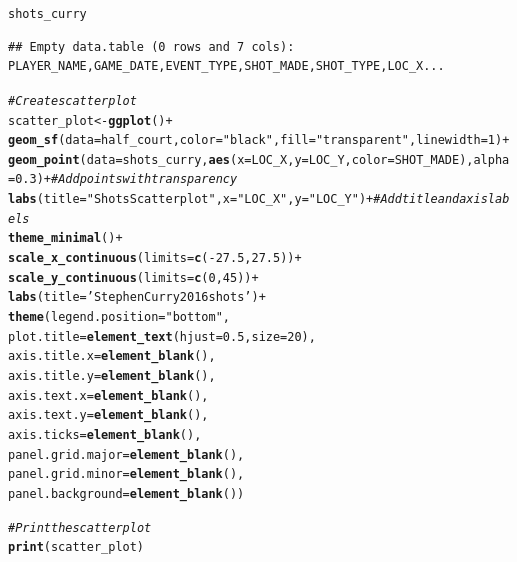 \documentclass{article}\usepackage[]{graphicx}\usepackage[]{xcolor}
\makeatletter
\newcommand{\hlnum}[1]{\textcolor[rgb]{0.686,0.059,0.569}{#1}}%
\newcommand{\hlstr}[1]{\textcolor[rgb]{0.192,0.494,0.8}{#1}}%
\newcommand{\hlcom}[1]{\textcolor[rgb]{0.678,0.584,0.686}{\textit{#1}}}%
\newcommand{\hlopt}[1]{\textcolor[rgb]{0,0,0}{#1}}%
\newcommand{\hlstd}[1]{\textcolor[rgb]{0.345,0.345,0.345}{#1}}%
\newcommand{\hlkwb}[1]{\textcolor[rgb]{0.69,0.353,0.396}{#1}}%
\newcommand{\hlkwc}[1]{\textcolor[rgb]{0.333,0.667,0.333}{#1}}%
\newcommand{\hlkwd}[1]{\textcolor[rgb]{0.737,0.353,0.396}{\textbf{#1}}}%
\newenvironment{kframe}{%
 \def\at@end@of@kframe{}%
 \ifinner\ifhmode%
  \def\at@end@of@kframe{\end{minipage}}%
  \begin{minipage}{\columnwidth}%
 \fi\fi%
 \def\FrameCommand##1{\hskip\@totalleftmargin \hskip-\fboxsep
 \colorbox{shadecolor}{##1}\hskip-\fboxsep
     \hskip-\linewidth \hskip-\@totalleftmargin \hskip\columnwidth}%
 \MakeFramed {\advance\hsize-\width
   \@totalleftmargin\z@ \linewidth\hsize
   \@setminipage}}%
 {\par\unskip\endMakeFramed%
 \at@end@of@kframe}
\newenvironment{knitrout}{}{} %
\makeatother
\begin{document}
\begin{knitrout}
\begin{kframe}
\begin{alltt}
\hlstd{shots_curry}
\end{alltt}
\begin{verbatim}
## Empty data.table (0 rows and 7 cols): PLAYER_NAME,GAME_DATE,EVENT_TYPE,SHOT_MADE,SHOT_TYPE,LOC_X...
\end{verbatim}
\begin{alltt}
\hlcom{# Create scatter plot}
\hlstd{scatter_plot} \hlkwb{<-} \hlkwd{ggplot}\hlstd{()} \hlopt{+}
  \hlkwd{geom_sf}\hlstd{(}\hlkwc{data} \hlstd{= half_court,} \hlkwc{color} \hlstd{=} \hlstr{"black"}\hlstd{,} \hlkwc{fill} \hlstd{=} \hlstr{"transparent"}\hlstd{,} \hlkwc{linewidth} \hlstd{=} \hlnum{1}\hlstd{)} \hlopt{+}
  \hlkwd{geom_point}\hlstd{(}\hlkwc{data} \hlstd{= shots_curry,} \hlkwd{aes}\hlstd{(}\hlkwc{x} \hlstd{= LOC_X,} \hlkwc{y} \hlstd{= LOC_Y,} \hlkwc{color} \hlstd{= SHOT_MADE),} \hlkwc{alpha} \hlstd{=} \hlnum{0.3}\hlstd{)} \hlopt{+}  \hlcom{# Add points with transparency}
  \hlkwd{labs}\hlstd{(}\hlkwc{title} \hlstd{=} \hlstr{"Shots Scatterplot"}\hlstd{,} \hlkwc{x} \hlstd{=} \hlstr{"LOC_X"}\hlstd{,} \hlkwc{y} \hlstd{=} \hlstr{"LOC_Y"}\hlstd{)} \hlopt{+}  \hlcom{# Add title and axis labels}
  \hlkwd{theme_minimal}\hlstd{()} \hlopt{+}
  \hlkwd{scale_x_continuous}\hlstd{(}\hlkwc{limits} \hlstd{=} \hlkwd{c}\hlstd{(}\hlopt{-}\hlnum{27.5}\hlstd{,} \hlnum{27.5}\hlstd{))} \hlopt{+}
  \hlkwd{scale_y_continuous}\hlstd{(}\hlkwc{limits} \hlstd{=} \hlkwd{c}\hlstd{(}\hlnum{0}\hlstd{,} \hlnum{45}\hlstd{))} \hlopt{+}
  \hlkwd{labs}\hlstd{(}\hlkwc{title} \hlstd{=} \hlstr{'Stephen Curry 2016 shots'}\hlstd{)} \hlopt{+}
  \hlkwd{theme}\hlstd{(}\hlkwc{legend.position} \hlstd{=} \hlstr{"bottom"}\hlstd{,}
        \hlkwc{plot.title} \hlstd{=} \hlkwd{element_text}\hlstd{(}\hlkwc{hjust} \hlstd{=} \hlnum{0.5}\hlstd{,} \hlkwc{size} \hlstd{=} \hlnum{20}\hlstd{),}
        \hlkwc{axis.title.x} \hlstd{=} \hlkwd{element_blank}\hlstd{(),}
        \hlkwc{axis.title.y} \hlstd{=} \hlkwd{element_blank}\hlstd{(),}
        \hlkwc{axis.text.x} \hlstd{=} \hlkwd{element_blank}\hlstd{(),}
        \hlkwc{axis.text.y} \hlstd{=} \hlkwd{element_blank}\hlstd{(),}
        \hlkwc{axis.ticks} \hlstd{=} \hlkwd{element_blank}\hlstd{(),}
        \hlkwc{panel.grid.major} \hlstd{=} \hlkwd{element_blank}\hlstd{(),}
        \hlkwc{panel.grid.minor} \hlstd{=} \hlkwd{element_blank}\hlstd{(),}
        \hlkwc{panel.background} \hlstd{=} \hlkwd{element_blank}\hlstd{())}

\hlcom{# Print the scatter plot}
\hlkwd{print}\hlstd{(scatter_plot)}
\end{alltt}
\end{kframe}


\end{knitrout}
\end{document}
